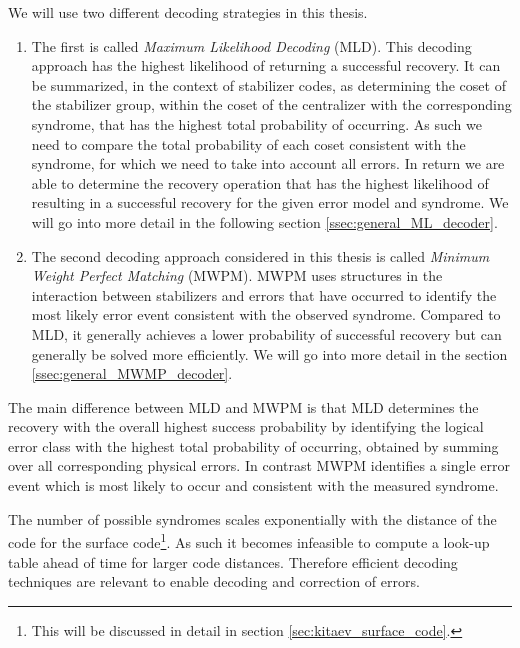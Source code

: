 We will use two different decoding strategies in this thesis.
\begin{enumerate}
\item The first is called \emph{Maximum Likelihood Decoding} (MLD). 
This decoding approach has the highest likelihood of returning a successful recovery.
It can be summarized, in the context of stabilizer codes, as determining the coset of the stabilizer group, within the coset of the centralizer with the corresponding syndrome, that has the highest total probability of occurring.
As such we need to compare the total probability of each coset consistent with the syndrome, for which we need to take into account all errors.
In return we are able to determine the recovery operation that has the highest likelihood of resulting in a successful recovery for the given error model and syndrome.
We will go into more detail in the following section \ref{ssec:general_ML_decoder}. 


\item The second decoding approach considered in this thesis is called \emph{Minimum Weight Perfect Matching} (MWPM).
MWPM uses structures in the interaction between stabilizers and errors that have occurred to identify the most likely error event consistent with the observed syndrome.
Compared to MLD, it generally achieves a lower probability of successful recovery but can generally be solved more efficiently. 
We will go into more detail in the section \ref{ssec:general_MWMP_decoder}. 

\end{enumerate}

The main difference between MLD and MWPM is that MLD determines the recovery with the overall highest success probability by identifying the logical error class with the highest total probability of occurring, 
obtained by summing over all corresponding physical errors. 
In contrast MWPM identifies a single error event which is most likely to occur and consistent with the measured syndrome.

The number of possible syndromes scales exponentially with the distance of the code for the surface code\footnote{This will be discussed in detail in section \ref{sec:kitaev_surface_code}.}.
As such it becomes infeasible to compute a look-up table ahead of time for larger code distances. 
Therefore efficient decoding techniques are relevant to enable decoding and correction of errors. 



